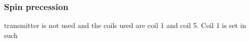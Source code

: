 \documentclass{article}
\begin{document}
\subsubsection{Spin precession}
transmitter is not used and the coils used are coil 1 and coil 5. Coil 1 is set in such
\end{document}
